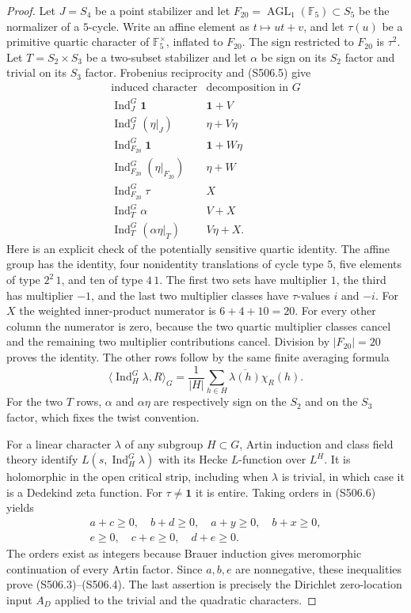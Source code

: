 \begin{proof}
Let $J=S_4$ be a point stabilizer and let
$F_{20}=\operatorname{AGL}_1(\mathbb F_5)\subset S_5$ be the
normalizer of a $5$-cycle.  Write an affine element as
$t\mapsto ut+v$, and let $\tau(u)$ be a primitive quartic character
of $\mathbb F_5^\times$, inflated to $F_{20}$.  The sign restricted
to $F_{20}$ is $\tau^2$.  Let
$T=S_2\times S_3$ be a two-subset stabilizer and let
$\alpha$ be sign on its $S_2$ factor and trivial on its $S_3$ factor.
Frobenius reciprocity and (S506.5) give
\[
\begin{array}{c|l}
\text{induced character}&\text{decomposition in }G\\\hline
\operatorname{Ind}_{J}^{G}\mathbf1&\mathbf1+V\\
\operatorname{Ind}_{J}^{G}(\eta|_J)&\eta+V\eta\\
\operatorname{Ind}_{F_{20}}^{G}\mathbf1&\mathbf1+W\eta\\
\operatorname{Ind}_{F_{20}}^{G}(\eta|_{F_{20}})&\eta+W\\
\operatorname{Ind}_{F_{20}}^{G}\tau&X\\
\operatorname{Ind}_{T}^{G}\alpha&V+X\\
\operatorname{Ind}_{T}^{G}(\alpha\eta|_T)&V\eta+X.
\end{array}
 \tag{S506.6}
\]
Here is an explicit check of the potentially sensitive quartic
identity.  The affine group has the identity, four nonidentity
translations of cycle type $5$, five elements of type $2^2\,1$,
and ten of type $4\,1$.  The first two sets have multiplier $1$,
the third has multiplier $-1$, and the last two multiplier classes
have $\tau$-values $i$ and $-i$.  For $X$ the weighted inner-product
numerator is $6+4+10=20$.  For every other column the numerator
is zero, because the two quartic multiplier classes cancel and
the remaining two multiplier contributions cancel.  Division by
$|F_{20}|=20$ proves the identity.  The other rows follow by the
same finite averaging formula
\[
 \bigl\langle\operatorname{Ind}_{H}^{G}\lambda,R\bigr\rangle_G
       =\frac1{|H|}\sum_{h\in H}\overline{\lambda(h)}\chi_R(h).
 \tag{S506.7}
\]
For the two $T$ rows, $\alpha$ and $\alpha\eta$ are respectively
sign on the $S_2$ and on the $S_3$ factor, which fixes the twist
convention.

For a linear character $\lambda$ of any subgroup $H\subset G$,
Artin induction and class field theory identify
$L(s,\operatorname{Ind}_H^G\lambda)$ with its Hecke $L$-function
over $L^H$.  It is holomorphic in the open critical strip,
including when $\lambda$ is trivial, in which case it is a
Dedekind zeta function.  For $\tau\ne\mathbf1$ it is entire.
Taking orders in (S506.6) yields
\[
 \begin{gathered}
 a+c\ge0,\quad b+d\ge0,\quad a+y\ge0,\quad b+x\ge0,\\
 e\ge0,\quad c+e\ge0,\quad d+e\ge0.
 \end{gathered}
\]
The orders exist as integers because Brauer induction gives
meromorphic continuation of every Artin factor.  Since $a,b,e$
are nonnegative, these inequalities prove (S506.3)--(S506.4).
The last assertion is precisely the Dirichlet zero-location
input $A_D$ applied to the trivial and the quadratic characters.
\end{proof}

